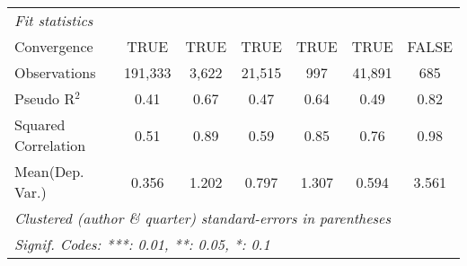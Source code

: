 \begin{tabular}{lcccccc}
   \midrule
   \emph{Fit statistics}\\
   Convergence                                                &TRUE     & TRUE          & TRUE         & TRUE          & TRUE         & FALSE\\  
   Observations                                               & 191,333 & 3,622         & 21,515       & 997           & 41,891       & 685\\  
   Pseudo R$^2$                                               & 0.41    & 0.67          & 0.47         & 0.64          & 0.49         & 0.82\\  
   Squared Correlation                                        & 0.51    & 0.89          & 0.59         & 0.85          & 0.76         & 0.98\\  
Mean(Dep. Var.) & 0.356 & 1.202 & 0.797 & 1.307 & 0.594 & 3.561 \\
   \midrule \midrule
   \multicolumn{7}{l}{\emph{Clustered (author \& quarter) standard-errors in parentheses}}\\
   \multicolumn{7}{l}{\emph{Signif. Codes: ***: 0.01, **: 0.05, *: 0.1}}\\
\end{tabular}
\par\endgroup
